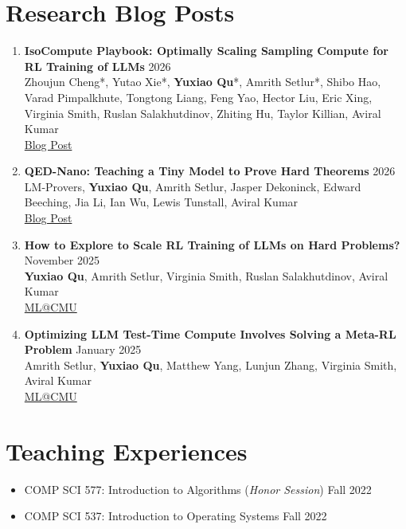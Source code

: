 \documentclass[11pt,letterpaper,roman,colorlinks=true,urlcolor=brown]{moderncv}
\begin{document}
\section{Research Blog Posts}
\begin{enumerate}
    \item \textbf{IsoCompute Playbook: Optimally Scaling Sampling Compute for RL Training of LLMs} \hfill 2026\\
    Zhoujun Cheng*, Yutao Xie*, \textbf{Yuxiao Qu}*, Amrith Setlur*, Shibo Hao, Varad Pimpalkhute, Tongtong Liang, Feng Yao, Hector Liu, Eric Xing, Virginia Smith, Ruslan Salakhutdinov, Zhiting Hu, Taylor Killian, Aviral Kumar\\
    \href{https://compute-optimal-rl-llm-scaling.github.io/}{Blog Post}
    \item \textbf{QED-Nano: Teaching a Tiny Model to Prove Hard Theorems} \hfill 2026\\
    LM-Provers, \textbf{Yuxiao Qu}, Amrith Setlur, Jasper Dekoninck, Edward Beeching, Jia Li, Ian Wu, Lewis Tunstall, Aviral Kumar\\
    \href{https://huggingface.co/spaces/lm-provers/qed-nano-blogpost}{Blog Post}
    \item \textbf{How to Explore to Scale RL Training of LLMs on Hard Problems?} \hfill November 2025\\
    \textbf{Yuxiao Qu}, Amrith Setlur, Virginia Smith, Ruslan Salakhutdinov, Aviral Kumar\\
    \href{https://blog.ml.cmu.edu/2025/11/26/how-to-explore-to-scale-rl-training-of-llms-on-hard-problems/}{ML@CMU}
    \item \textbf{Optimizing LLM Test-Time Compute Involves Solving a Meta-RL Problem} \hfill January 2025\\
    Amrith Setlur, \textbf{Yuxiao Qu}, Matthew Yang, Lunjun Zhang, Virginia Smith, Aviral Kumar\\
    \href{https://blog.ml.cmu.edu/2025/01/08/optimizing-llm-test-time-compute-involves-solving-a-meta-rl-problem/}{ML@CMU}
\end{enumerate}

\section{Teaching Experiences}
\begin{itemize}
    \item COMP SCI 577: Introduction to Algorithms (\textit{Honor Session}) \hfill Fall 2022
    \item COMP SCI 537: Introduction to Operating Systems \hfill Fall 2022
\end{itemize}
\end{document}
